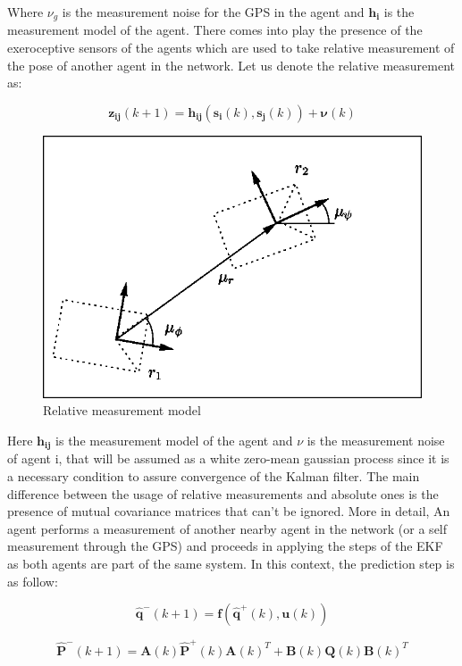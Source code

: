 \documentclass[conference]{IEEEtran}
\begin{document}
Where $\nu_{g}$ is the measurement noise for the GPS in the agent and  $\mathbf{h_{i}}$ is the measurement model of the agent.
There comes into play the presence of the exeroceptive sensors of the agents which are used to take relative measurement of the pose of another agent in the network. Let us denote the relative measurement as:

$$  \mathbf{z_{ij}}(k+1) =  \mathbf{h_{ij}}(\mathbf{s_{i}}(k), \mathbf{s_{j}}(k))+\mathbf{\nu}(k) $$

\begin{figure}[H]
 \includegraphics[width=\linewidth]{dwg/relative.png}
  \caption{Relative measurement model}
 
\end{figure}

Here $\mathbf{h_{ij}}$ is the measurement model of the agent and $\nu$ is the measurement noise of agent i, that will be assumed as a white zero-mean gaussian process since it is a necessary condition to assure convergence of the Kalman filter.
The main difference between the usage of relative measurements and absolute ones is the presence of mutual covariance matrices that can't be ignored. More in detail, An agent performs a measurement of another nearby agent in the network (or a self measurement through the GPS) and proceeds in applying the steps of the EKF as both agents are part of the same system. In this context, the prediction step is as follow:

$$  \mathbf{\hat{q}^{-}}(k+1) =  \mathbf{f}(\mathbf{\hat{q}^{+}}(k), \mathbf{u}(k)) $$

$$  \mathbf{\hat{P}^{-}}(k+1) =  \mathbf{A}(k)\mathbf{\hat{{P}}^{+}}(k)\mathbf{A}(k)^{T} + \mathbf{B}(k)\mathbf{{Q}}(k) \mathbf{B}(k)^{T} $$
\end{document}
